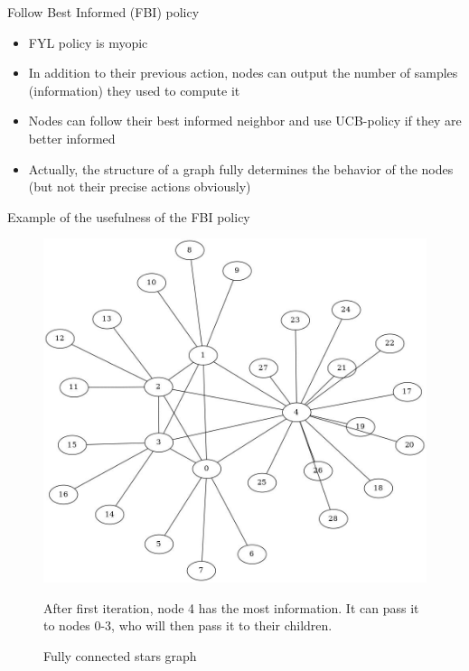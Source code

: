 \documentclass{beamer}
\begin{document}
\begin{frame}{Follow Best Informed (FBI) policy}
\begin{itemize}
\item FYL policy is myopic
\item In addition to their previous action, nodes can output the number of samples (information) they used to compute it
\item Nodes can \alert{follow their best informed neighbor and use UCB-policy if they are better informed}
\item Actually, the structure of a graph fully determines the behavior of the nodes (but not their precise actions obviously)
\end{itemize}
\end{frame}

\begin{frame}{Example of the usefulness of the FBI policy}
\begin{figure}
\includegraphics[scale=0.18]{fcstars}
\caption{\centering Fully connected stars graph}
After first iteration, node 4 has the most information. It can pass it to nodes 0-3, who will then pass it to their children.
\end{figure}
\end{frame}
\end{document}
